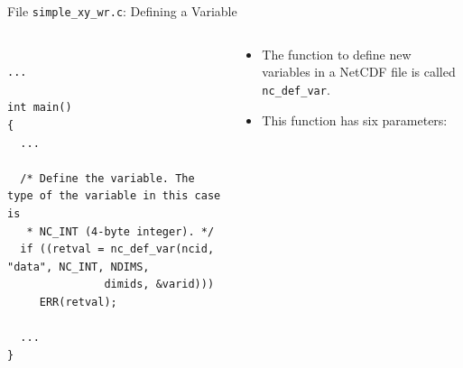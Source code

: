 \documentclass[compress,11pt,xcolor=svgnames,aspectratio=169]{beamer}
\begin{document}
\begin{frame}[fragile]{File \texttt{simple\_xy\_wr.c}: Defining a Variable}

\begin{columns}

\begin{column}{0.5\textwidth}

{\tiny

\begin{verbatim}

...

int main()
{
  ...

  /* Define the variable. The type of the variable in this case is
   * NC_INT (4-byte integer). */
  if ((retval = nc_def_var(ncid, "data", NC_INT, NDIMS,
               dimids, &varid)))
     ERR(retval);

  ...
}

\end{verbatim}

}

\end{column}

\begin{column}{0.5\textwidth}

{\footnotesize

\begin{itemize}
\setlength\itemsep{0.5cm}

\item The function to define new variables in a NetCDF file is called \verb|nc_def_var|.

\item This function has six parameters:


\end{itemize}

}

\end{column}

\end{columns}

\end{frame}
\end{document}
